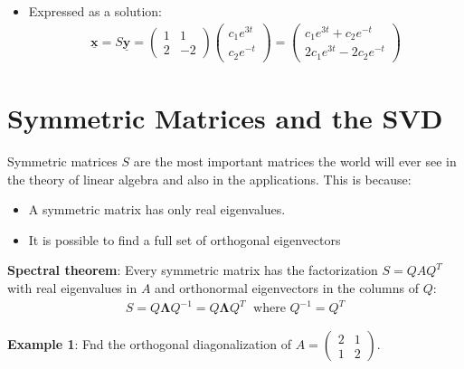 \documentclass[10pt,a4paper]{article}
\begin{document}
\begin{itemize}
    \item Expressed as a solution:
    \begin{align*}
        \underline{\mathbf{x}}=S \underline{\mathbf{y}}=\left(\begin{array}{rr}
            1 & 1 \\
            2 & -2
            \end{array}\right)\left(\begin{array}{c}
            c_{1} e^{3 t} \\
            c_{2} e^{-t}
            \end{array}\right)=\left(\begin{array}{c}
            c_{1} e^{3 t}+c_{2} e^{-t} \\
            2 c_{1} e^{3 t}-2 c_{2} e^{-t}
            \end{array}\right)
    \end{align*}
\end{itemize}

\pagebreak
\section{Symmetric Matrices and the SVD}

Symmetric matrices $S$ are the most important matrices the world will ever see in the theory of
linear algebra and also in the applications. This is because:
\begin{itemize}
    \item A symmetric matrix has only real eigenvalues.
    \item It is possible to ﬁnd a full set of orthogonal eigenvectors
\end{itemize}

\begin{tcolorbox}[breakable,colback=white]
\textbf{Spectral theorem}: Every symmetric matrix has the factorization $S = QAQ^T$ with real
eigenvalues in $A$ and orthonormal eigenvectors in the columns of $Q$:
\begin{align*}
    S = Q\mathbf{\Lambda}Q^{-1} = Q\mathbf{\Lambda}Q^T \; \text{ where }Q^{-1} = Q^T
\end{align*}
\end{tcolorbox}

\textbf{Example 1}: Fnd the orthogonal diagonalization of $A = \begin{pmatrix}
    2&1\\1&2
\end{pmatrix}$.
\end{document}
